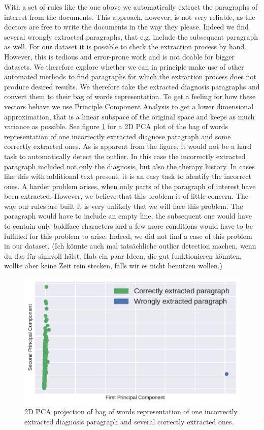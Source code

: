 With a set of rules like the one above we automatically extract the
paragraphs of interest from the documents. This approach, however,
is not very reliable, as the doctors are free to write the documents
in the way they please. Indeed we find several wrongly extracted paragraphs,
that e.g. include the subsequent paragraph as well. For our dataset
it is possible to check the extraction process by hand. However, this
is tedious and error-prone work and is not doable for bigger
datasets. We therefore explore whether we can in principle make use
of other automated methods to find paragraphs for which the extraction
process does not produce desired results. We therefore take the extracted
diagnosis paragraphs and convert them to their bag of words representation.
To get a feeling for how these vectors behave we use Principle Component
Analysis to get a lower dimensional approximation, that is a linear
subspace of the original space and keeps as much variance as possible.
See figure \ref{fig:bow_find_odd} for a 2D PCA plot of the bag of words representation
of one incorrectly extracted diagnose paragraph and some correctly
extracted ones. As is apparent from the figure, it would not be a
hard task to automatically detect the outlier. In this case the incorrectly
extracted paragraph included not only the diagnosis, but also the
therapy history. In cases like this with additional text present, it is an easy task to
identify the incorrect ones. A harder problem arises, when only parts
of the paragraph of interest have been extracted. However, we believe
that this problem is of little concern. The way our rules are built it
is very unlikely that we will face this problem. The paragraph would
have to include an empty line, the subsequent one would have to contain
only boldface characters and a few more conditions would have to be
fulfilled for this problem to arise. Indeed, we did not find a case
of this problem in our dataset. (Ich könnte auch mal tatsächliche outlier detection machen, wenn du das für sinnvoll hälst. Hab ein paar Ideen, die gut funktionieren könnten, wollte aber keine Zeit rein stecken, falls wir es nicht benutzen wollen.)
\begin{figure}
	\includegraphics[width=\linewidth]{figures/bow_find_odd}
	\caption{2D PCA projection of bag of words representation of one incorrectly extracted diagnosis paragraph and several correctly extracted ones.}
	\label{fig:bow_find_odd}
\end{figure}

